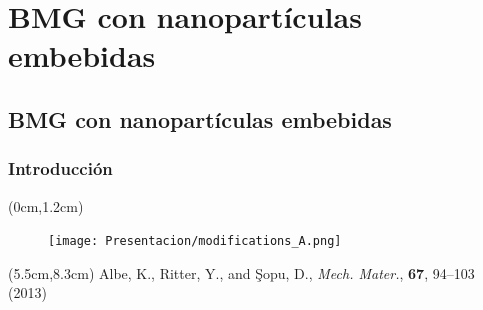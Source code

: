 
\section[BMG con nanopart\'iculas]{BMG con nanopart\'iculas embebidas}
\subsection{BMG con nanopart\'iculas embebidas}

\begin{frame}
  \frametitle{Introducci\'on}
  \begin{textblock*}{12.6cm}(0cm,1.2cm)
    \begin{figure}
    \centering
    \texttt{[image: Presentacion/modifications\_A.png]}
    \end{figure}
  \end{textblock*}

  \begin{textblock*}{4.5cm}(5.5cm,8.3cm)
  \scriptsize{Albe, K., Ritter, Y., and Şopu, D., \textit{Mech. Mater.}, \textbf{67}, 94–103 (2013)}
  \end{textblock*}
\end{frame}

